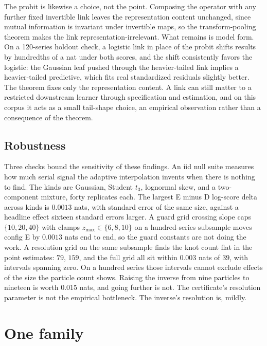 \documentclass[11pt]{article}
\theoremstyle{remark}
\begin{document}
The probit is likewise a choice, not the point. Composing the operator with any further
fixed invertible link leaves the representation content unchanged, since mutual information
is invariant under invertible maps, so the transform-pooling theorem makes the link
representation-irrelevant. What remains is model form. On a 120-series holdout check, a
logistic link in place of the probit shifts results by hundredths of a nat under both
scores, and the shift consistently favors the logistic: the Gaussian leaf pushed through
the heavier-tailed link implies a heavier-tailed predictive, which fits real standardized
residuals slightly better. The theorem fixes only the representation content. A link can still matter to a
restricted downstream learner through specification and estimation, and on this corpus
it acts as a small tail-shape choice, an empirical observation rather than a
consequence of the theorem.

\subsection{Robustness}\label{sec:robust}

Three checks bound the sensitivity of these findings. An iid null suite measures how much serial signal the adaptive interpolation
invents when there is nothing to find. The kinds are Gaussian, Student $t_3$,
lognormal skew, and a two-component mixture, forty replicates each. The largest E
minus D log-score delta across kinds is $0.0013$ nats, with standard error of the
same size, against a headline effect sixteen standard errors larger.
A guard grid crossing slope caps $\{10, 20, 40\}$ with clamps
$z_{\max} \in \{6, 8, 10\}$ on a hundred-series subsample moves config E by
$0.0013$ nats end to end, so the guard constants are not doing the work. A resolution
grid on the same subsample finds the knot count flat in the point estimates: $79$,
$159$, and the full grid all sit within $0.003$ nats of $39$, with intervals spanning
zero. On a hundred series those intervals cannot exclude effects of the size the
particle count shows. Raising the inverse from nine particles to nineteen is worth
$0.015$ nats, and going further is not. The certificate's resolution parameter is not the empirical bottleneck. The
inverse's resolution is, mildly.

\section{One family}\label{sec:family}
\end{document}
